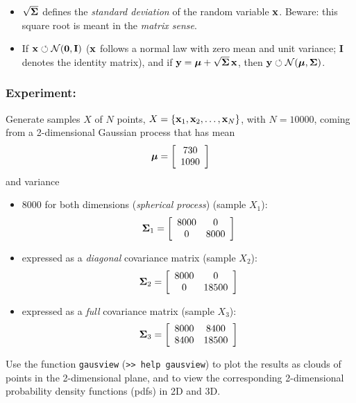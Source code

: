 \documentclass[a4paper]{article}
\newcommand{\com}[1]{{\tt #1}}
\newcommand{\xv}{\ensuremath\mathbf{x}}  %
\newcommand{\muv}{\ensuremath\boldsymbol{\mu}}  %
\newcommand{\Sm}{\ensuremath\boldsymbol{\Sigma}}  %
\begin{document}
\begin{itemize}
\item $\sqrt{\Sm}$ defines the {\em standard deviation} of the random
  variable $\xv$. Beware: this square root is meant in the {\em matrix
    sense}.
  
\item If $\xv \circlearrowleft {\cal N}(\mathbf{0},\mathbf{I})$ ($\xv$
  follows a normal law with zero mean and unit variance; $\mathbf{I}$
  denotes the identity matrix), and if $\mathbf{y} = \muv +
  \sqrt{\Sm}\,\xv$, then $\mathbf{y} \circlearrowleft {\cal
    N}(\muv,\Sm)$.

\end{itemize}


\subsubsection{Experiment:}
Generate samples $X$ of $N$ points, $X=\{\xv_1,
\xv_2,\ldots,\xv_N\}$, with $N=10000$, coming from a 2-dimensional
Gaussian process that has mean
\[
\muv = \left[ \begin{array}{c} 730 \\ 1090 \end{array} \right]
\]
and variance
\begin{itemize}
\item
  8000 for both dimensions ({\em spherical process}) (sample $X_1$):
  \[
  \Sm_1 = \left[ \begin{array}{cc}
      8000 & 0 \\
      0    & 8000
    \end{array} \right]
  \]
\item
  expressed as a {\em diagonal} covariance matrix (sample $X_2$):
  \[
  \Sm_2 = \left[ \begin{array}{cc}
      8000 & 0 \\
      0    & 18500
    \end{array} \right]
  \]
\item
  expressed as a {\em full} covariance matrix (sample $X_3$):
  \[
  \Sm_3 = \left[ \begin{array}{cc}
      8000 & 8400 \\
      8400 & 18500
    \end{array} \right]
  \]
\end{itemize}
%
Use the function \com{gausview} (\com{>> help gausview}) to plot the
results as clouds of points in the 2-dimensional plane, and to view the
corresponding 2-dimensional probability density functions (pdfs) in 2D and
3D.
\end{document}
